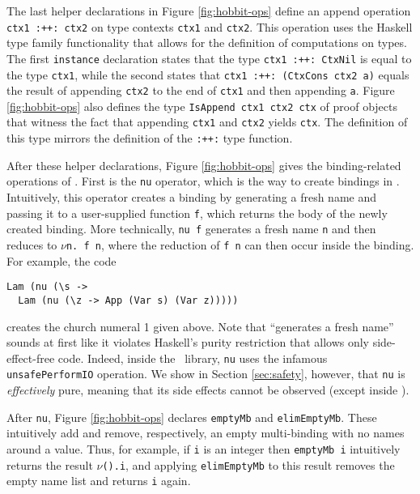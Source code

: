\documentclass[natbib]{sigplanconf}
\begin{document}
The last helper declarations in Figure \ref{fig:hobbit-ops} define an
append operation \lstinline{ctx1 :++: ctx2} on type contexts
\lstinline{ctx1} and \lstinline{ctx2}.  This operation uses the
Haskell type family functionality that allows for the definition of
computations on types. The first \lstinline{instance} declaration
states that the type \lstinline{ctx1 :++: CtxNil} is equal to the type
\lstinline{ctx1}, while the second states that
\lstinline{ctx1 :++: (CtxCons ctx2 a)} equals the result of appending
\lstinline{ctx2} to the end of \lstinline{ctx1} and then appending
\lstinline{a}. Figure \ref{fig:hobbit-ops} also defines the type
\lstinline{IsAppend ctx1 ctx2 ctx} of proof objects that witness the
fact that appending \lstinline{ctx1} and \lstinline{ctx2} yields
\lstinline{ctx}. The definition of this type mirrors the definition of
the \lstinline{:++:} type function.


After these helper declarations, Figure \ref{fig:hobbit-ops} gives the
binding-related operations of \ourlib.  First is the \lstinline{nu}
operator, which is the way to create bindings in \ourlib.
Intuitively, this operator creates a binding by generating a fresh
name and passing it to a user-supplied function \lstinline{f}, which
returns the body of the newly created binding.  More technically,
\lstinline{nu f} generates a fresh name \lstinline{n} and then reduces
to $\nu$\lstinline{n. f n}, where the reduction of \lstinline{f n} can
then occur inside the binding. For example, the code
\begin{lstlisting}
Lam (nu (\s ->
  Lam (nu (\z -> App (Var s) (Var z)))))
\end{lstlisting}
creates the church numeral 1 given above.  Note that ``generates a
fresh name'' sounds at first like it violates Haskell's purity
restriction that allows only side-effect-free code. Indeed, inside the
\ourlib\ library, \lstinline{nu} uses the infamous
\lstinline{unsafePerformIO} operation. We show in Section
\ref{sec:safety}, however, that \lstinline{nu} is \emph{effectively}
pure, meaning that its side effects cannot be observed (except inside
\ourlib).


After \lstinline{nu}, Figure \ref{fig:hobbit-ops} declares
\lstinline{emptyMb} and \lstinline{elimEmptyMb}. These intuitively add
and remove, respectively, an empty multi-binding with no names around
a value. Thus, for example, if \lstinline{i} is an integer then
\lstinline{emptyMb i} intuitively returns the result
$\nu$\lstinline{().i}, and applying \lstinline{elimEmptyMb} to this
result removes the empty name list and returns \lstinline{i} again.
\end{document}

